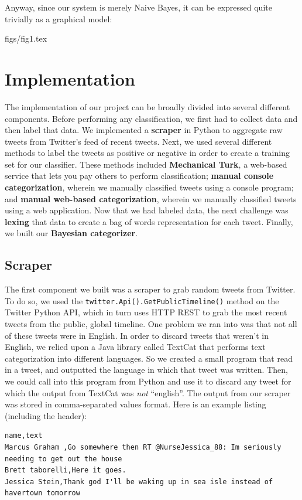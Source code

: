 \documentclass[12pt,a4paper]{article}
\begin{document}
Anyway, since our system is merely Naive Bayes, it can be expressed quite trivially as a graphical model:

 { figs/fig1.tex }

\section{ Implementation }

The implementation of our project can be broadly divided into several different components. Before performing any classification, we first had to collect data and then label that data. We implemented a \textbf{scraper} in Python to aggregate raw tweets from Twitter's feed of recent tweets. Next, we used several different methods to label the tweets as positive or negative in order to create a training set for our classifier. These methods included \textbf{Mechanical Turk}, a web-based service that lets you pay others to perform classification; \textbf{manual console categorization}, wherein we manually classified tweets using a console program; and \textbf{manual web-based categorization}, wherein we manually classified tweets using a web application. Now that we had labeled data, the next challenge was \textbf{lexing} that data to create a bag of words representation for each tweet. Finally, we built our \textbf{Bayesian categorizer}.

\subsection { Scraper }

The first component we built was a scraper to grab random tweets from Twitter. To do so, we used the \texttt{twitter.Api().GetPublicTimeline()} method on the Twitter Python API, which in turn uses HTTP REST to grab the most recent tweets from the public, global timeline. One problem we ran into was that not all of these tweets were in English. In order to discard tweets that weren't in English, we relied upon a Java library called TextCat that performs text categorization into different languages. So we created a small program that read in a tweet, and outputted the language in which that tweet was written. Then, we could call into this program from Python and use it to discard any tweet for which the output from TextCat was \emph{not} ``english''. The output from our scraper was stored in comma-separated values format. Here is an example listing (including the header):

\begin{verbatim}
name,text
Marcus Graham ,Go somewhere then RT @NurseJessica_88: Im seriously needing to get out the house
Brett taborelli,Here it goes.
Jessica Stein,Thank god I'll be waking up in sea isle instead of havertown tomorrow
\end{verbatim}
\end{document}
